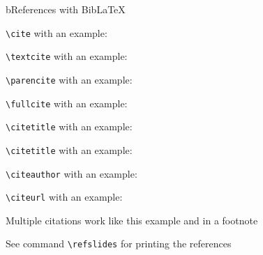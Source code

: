 \begin{myslidefragile}{b}{References with Bib\LaTeX}

\lstinline{\cite} with an example: \cite{Shampine2007}

\lstinline{\textcite} with an example: \textcite{Shampine2007}

\lstinline{\parencite} with an example: \parencite{Shampine2007}

\lstinline{\fullcite} with an example: 

\vspace*{\baselineskip}

\lstinline{\citetitle} with an example: 

\lstinline{\citetitle} with an example: 

\lstinline{\citeauthor} with an example: \citeauthor{Shampine2007}

\lstinline{\citeurl} with an example: 

\vspace*{\baselineskip}

Multiple citations work like this example \parencite{Martins2021, Boyd2009, Cipra2000} and in a footnote

\vspace*{\baselineskip}

See command \lstinline{\refslides} for printing the references

\end{myslidefragile}